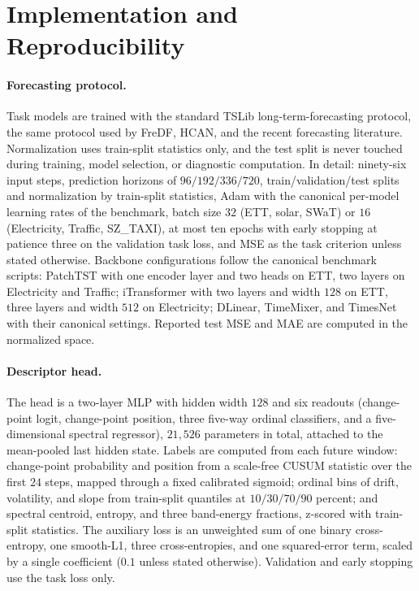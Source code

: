 \section{Implementation and Reproducibility}
\label{app:repro}

\paragraph{Forecasting protocol.}
Task models are trained with the standard TSLib long-term-forecasting protocol, the same protocol used by FreDF, HCAN, and the recent forecasting literature. Normalization uses train-split statistics only, and the test split is never touched during training, model selection, or diagnostic computation. In detail: ninety-six input steps, prediction horizons of $96/192/336/720$, train/validation/test splits and normalization by train-split statistics, Adam with the canonical per-model learning rates of the benchmark, batch size $32$ (ETT, solar, SWaT) or $16$ (Electricity, Traffic, SZ\_TAXI), at most ten epochs with early stopping at patience three on the validation task loss, and MSE as the task criterion unless stated otherwise. Backbone configurations follow the canonical benchmark scripts: PatchTST with one encoder layer and two heads on ETT, two layers on Electricity and Traffic; iTransformer with two layers and width $128$ on ETT, three layers and width $512$ on Electricity; DLinear, TimeMixer, and TimesNet with their canonical settings. Reported test MSE and MAE are computed in the normalized space.

\paragraph{Descriptor head.}
The head is a two-layer MLP with hidden width $128$ and six readouts (change-point logit, change-point position, three five-way ordinal classifiers, and a five-dimensional spectral regressor), $21{,}526$ parameters in total, attached to the mean-pooled last hidden state. Labels are computed from each future window: change-point probability and position from a scale-free CUSUM statistic over the first $24$ steps, mapped through a fixed calibrated sigmoid; ordinal bins of drift, volatility, and slope from train-split quantiles at $10/30/70/90$ percent; and spectral centroid, entropy, and three band-energy fractions, z-scored with train-split statistics. The auxiliary loss is an unweighted sum of one binary cross-entropy, one smooth-L1, three cross-entropies, and one squared-error term, scaled by a single coefficient ($0.1$ unless stated otherwise). Validation and early stopping use the task loss only.

